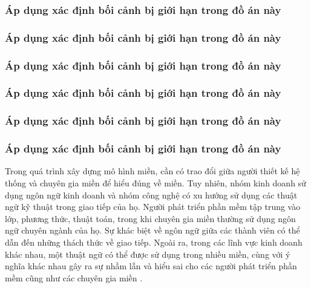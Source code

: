 \subsubsection{Áp dụng xác định bối cảnh bị giới hạn trong đồ án này}

\subsubsection{Áp dụng xác định bối cảnh bị giới hạn trong đồ án này}

\subsubsection{Áp dụng xác định bối cảnh bị giới hạn trong đồ án này}

\subsubsection{Áp dụng xác định bối cảnh bị giới hạn trong đồ án này}

\subsubsection{Áp dụng xác định bối cảnh bị giới hạn trong đồ án này}

\subsubsection{Áp dụng xác định bối cảnh bị giới hạn trong đồ án này}











Trong quá trình xây dựng mô hình miền, cần có trao đổi giữa người thiết kế hệ thống và chuyên gia miền để hiểu đúng về miền. Tuy nhiên, nhóm kinh doanh sử dụng ngôn ngữ kinh doanh và nhóm công nghệ có xu hướng sử dụng các thuật ngữ kỹ thuật trong giao tiếp của họ. Người phát triển phần mềm tập trung vào lớp, phương thức, thuật toán, trong khi chuyên gia miền thường sử dụng ngôn ngữ chuyên ngành của họ. Sự khác biệt về ngôn ngữ giữa các thành viên có thể dẫn đến những thách thức về giao tiếp. Ngoài ra, trong các lĩnh vực kinh doanh khác nhau, một thuật ngữ có thể được sử dụng trong nhiều miền, cùng với ý nghĩa khác nhau gây ra sự nhầm lẫn và hiểu sai cho các người phát triển phần mềm cũng như các chuyên gia miền .

